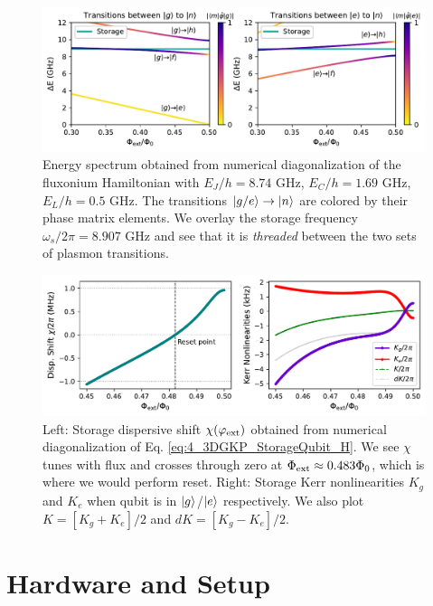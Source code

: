 \begin{figure}[h]
    \centering
    \includegraphics[width=0.93\linewidth]{Figures/4/3D_GKP_Theory_Spectrum.pdf}
    \caption{Energy spectrum obtained from numerical diagonalization of the fluxonium Hamiltonian with $E_J/h = 8.74$ GHz, $E_C/h = 1.69$ GHz, $E_L/h = 0.5$ GHz. The transitions $\lvert g/e\rangle\to\lvert n\rangle$ are colored by their phase matrix elements. We overlay the storage frequency $\omega_s/2\pi = 8.907$ GHz and see that it is \textit{threaded} between the two sets of plasmon transitions.}
    \label{fig:4_3D_GKP_Theory_Spectrum}
\end{figure}
\begin{figure}[h]
    \centering
    \includegraphics[width=0.93\linewidth]{Figures/4/3D_GKP_Theory_ChiKerr.pdf}
    \caption{Left: Storage dispersive shift $\chi(\varphi_{\rm ext})$ obtained from numerical diagonalization of Eq. \eqref{eq:4_3DGKP_StorageQubit_H}. We see $\chi$ tunes with flux and crosses through zero at $\Phi_{\rm ext} \approx 0.483\Phi_0$, which is where we would perform reset. Right: Storage Kerr nonlinearities $K_g$ and $K_e$ when qubit is in $\lvert g\rangle$/$\lvert e\rangle$ respectively. We also plot $K = [K_g+K_e]/2$ and $dK = [K_g-K_e]/2$.}
    \label{fig:4_3D_GKP_Theory_ChiKerr}
\end{figure}

\clearpage
\section{Hardware and Setup\label{sec:4_Hardware_and_Setup}}

